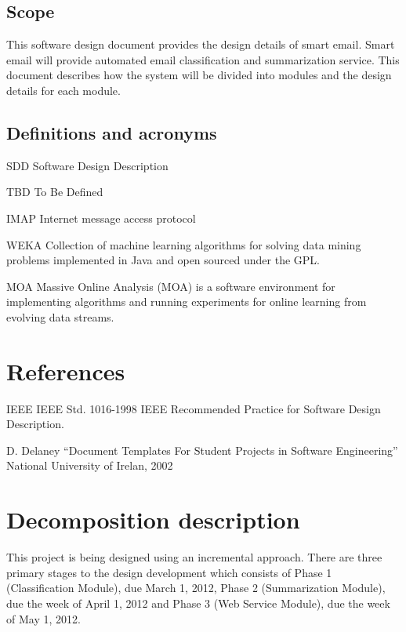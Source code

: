 \documentclass[12pt]{article}
\newenvironment{my_desc}
{\begin{description}
  \setlength{\itemsep}{0cm}
  \setlength{\parskip}{0cm}}
{\end{description}}
\begin{document}
\subsection{Scope}
This software design document provides the design details of smart email. Smart email will provide automated email classification and summarization service. This document describes how the system will be divided into modules and the design details for each module.

\subsection{Definitions and acronyms}
  \begin{my_desc}
    \item[SDD] Software Design Description
    \item[TBD] To Be Defined
    \item[IMAP] Internet message access protocol
    \item[WEKA] Collection of machine learning algorithms for solving data mining problems implemented in Java and open sourced under the GPL.
    \item[MOA] Massive Online Analysis (MOA) is a software environment for implementing algorithms and running experiments for online learning from evolving data streams.
  \end{my_desc}


\section{References}
  \begin{my_desc}
\item[IEEE]  IEEE Std. 1016-1998 IEEE Recommended Practice for Software Design 
Description.
\item[D. Delaney] ``Document Templates For Student Projects in Software Engineering''
National University of Irelan, 2002
  \end{my_desc}

\section{Decomposition description}
This project is being designed using an incremental approach. There are three primary 
stages to the design development which consists of Phase 1 (Classification Module), 
due March 1, 2012, Phase 2 (Summarization Module), due the week of April 1, 2012 
and Phase 3 (Web Service Module), due the week of May 1, 2012.
\end{document}
